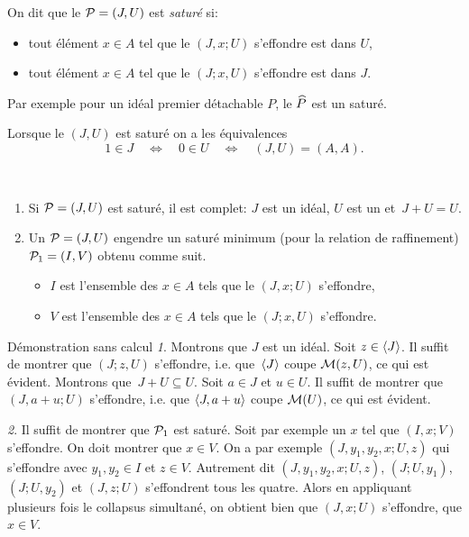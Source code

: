 
\begin{definition} 
\label{defSat1}{\rm
On dit que le  \proi ${\cal P}=(J,U)$  est \emph{saturé} si:
\begin{itemize}
%
\item tout élément $x\in A$  tel que le \proi
$(J, {x} ; U)$ s'effondre est dans $U$,
%
\item tout élément $x\in A$  tel que le \proi
$(J; {x} , U)$ s'effondre est dans $J$. 
%
\end{itemize}}
\end{definition}

Par exemple pour un idéal premier détachable $P$, le \proi $\widehat P$ est un \proi saturé. 

Lorsque le \proi $(J,U)$ est saturé  
on a les équivalences
$$ 1\in J\quad \Longleftrightarrow\quad  0\in U\quad 
\Longleftrightarrow\quad  (J,U)=(A,A).
$$

\begin{lemma} \label{lemSat1}~
%
\begin{enumerate}
%
\item Si ${\cal P}=(J,U)$ est saturé, il est complet: $J$ est un idéal, $U$ est un \mo \hbox{et $J+U=U$}.
%
\item 
Un \proi ${\cal P}=(J,U)$ engendre un \proi saturé minimum (pour la relation de raffinement)
${\cal P}_1=(I,V)$ obtenu comme suit.
\begin{itemize}
%
\item $I$ est l'ensemble des $x\in A$  tels que le \proi
$(J,x;U)$ s'effondre,
%
\item $V$ est l'ensemble des $x\in A$  tels que le \proi
$(J;x,U)$ s'effondre. 
%
\end{itemize}
%
\end{enumerate}

\end{lemma}
%
\begin{Proof}{Démonstration sans calcul} \emph{1}. 
Montrons que $J$ est un idéal. Soit $z\in \left\langle{J}\right\rangle$. Il suffit de montrer que $(J;z,U)$ s'effondre, i.e. que~$\left\langle{J}\right\rangle$ coupe ${\cal M}(z,U)$, ce qui est évident.  
Montrons \hbox{que $J+U\subseteq U$}. Soit $a\in J$ et $u\in U$. Il suffit de montrer que $(J,a+u;U)$ s'effondre, i.e. que $\left\langle{J,a+u}\right\rangle$ coupe ${\cal M}(U)$, ce qui est évident.

\sni \emph{2}.
Il suffit de montrer que ${\cal P}_1$ est saturé. Soit par exemple un $x$
tel que $(I,x;V)$ s'effondre. On doit montrer que $x\in V$.
On a par exemple $(J,y_1,y_2,x;U,z)$ qui s'effondre avec $y_1,y_2\in I$ et $z\in V$. Autrement dit $(J,y_1,y_2,x;U,z)$, $(J;U,y_1)$,  $(J;U,y_2)$
et $(J,z;U)$ s'effondrent tous les quatre. Alors en appliquant plusieurs fois le collapsus simultané, on obtient bien que $(J,x;U)$ s'effondre, \cad que $x\in V$.  
\end{Proof}
%


